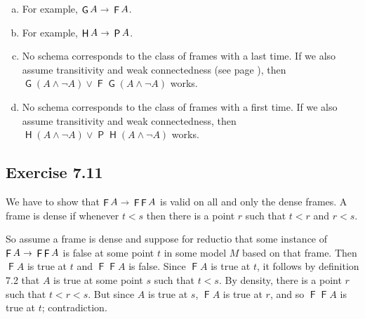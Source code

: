 \documentclass{scrartcl}
\let\oldto\to
\renewcommand\to{\scaleobj{0.95}{\,\oldto\,}}
\DeclareMathOperator{\tP}{\mathsf{P}}
\DeclareMathOperator{\tF}{\mathsf{F}}
\DeclareMathOperator{\tG}{\mathsf{G}}
\DeclareMathOperator{\tH}{\mathsf{H}}
\begin{document}
%
%
  \begin{enumerate}[(a)]
  \item For example, $\tG A \to \tF A$.
  \item For example, $\tH A \to \tP A$.
  \item No schema corresponds to the class of frames with a last time. If we
    also assume transitivity and weak connectedness (see page
    \pageref{weakconnectedness}), then
    $\tG(A \land \neg A) \lor \tF\tG(A \land \neg A)$ works. %
  \item No schema corresponds to the class of frames with a first time. If we
    also assume transitivity and weak connectedness, then
    $\tH(A \land \neg A) \lor \tP\tH(A \land \neg A)$ works.
  \end{enumerate}

  \subsection*{Exercise 7.11}

%
%
  We have to show that $\tF A \to \tF\tF A$ is valid on all and only the dense
  frames. A frame is dense if whenever $t<s$ then there is a point $r$ such that
  $t<r$ and $r<s$.

  So assume a frame is dense and suppose for reductio that some instance of
  $\tF A \to \tF\tF A$ is false at some point $t$ in some model $M$ based on
  that frame. Then $\tF A$ is true at $t$ and $\tF\tF A$ is false. Since $\tF A$
  is true at $t$, it follows by definition 7.2 that $A$
  is true at some point $s$ such that $t<s$. By density, there is a point $r$
  such that $t<r<s$. But since $A$ is true at $s$, $\tF A$ is true at $r$, and
  so $\tF\tF A$ is true at $t$; contradiction.
\end{document}
